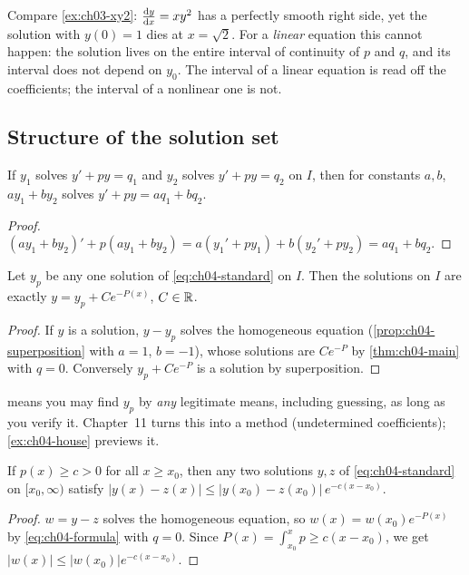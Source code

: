 \begin{remark}\label{rem:ch04-global}
Compare \cref{ex:ch03-xy2}: $\frac{\mathrm{d}y}{\mathrm{d}x} = xy^2$ has a perfectly smooth right
side, yet the solution with $y(0)=1$ dies at $x = \sqrt2$. For a
\emph{linear} equation this cannot happen: the solution lives on the entire
interval of continuity of $p$ and $q$, and its interval does not depend on
$y_0$. The interval of a linear equation is read off the coefficients; the
interval of a nonlinear one is not.
\end{remark}

\subsection{Structure of the solution set}


\begin{proposition}[Superposition]\label{prop:ch04-superposition}
If $y_1$ solves $y' + py = q_1$ and $y_2$ solves $y' + py = q_2$ on $I$, then
for constants $a,b$, $ay_1 + by_2$ solves $y' + py = aq_1 + bq_2$.
\end{proposition}
\begin{proof}
$(ay_1 + by_2)' + p(ay_1 + by_2) = a(y_1' + py_1) + b(y_2' + py_2) = aq_1 + bq_2$.
\end{proof}

\begin{corollary}[General $=$ particular $+$ homogeneous]\label{cor:ch04-structure}
Let $y_p$ be any one solution of \eqref{eq:ch04-standard} on $I$. Then the
solutions on $I$ are exactly $y = y_p + Ce^{-P(x)}$, $C\in\mathbb{R}$.
\end{corollary}
\begin{proof}
If $y$ is a solution, $y - y_p$ solves the homogeneous equation
(\cref{prop:ch04-superposition} with $a = 1$, $b = -1$), whose solutions are
$Ce^{-P}$ by \cref{thm:ch04-main} with $q = 0$. Conversely
$y_p + Ce^{-P}$ is a solution by superposition.
\end{proof}

 means you may find $y_p$ by \emph{any} legitimate
means, including guessing, as long as you verify it. Chapter~11 turns this
into a method (undetermined coefficients); \cref{ex:ch04-house} previews it.

\begin{proposition}\label{prop:ch04-transient}
If $p(x)\ge c>0$ for all $x\ge x_0$, then any two solutions $y, z$ of
\eqref{eq:ch04-standard} on $[x_0,\infty)$ satisfy
$|y(x) - z(x)|\le|y(x_0) - z(x_0)|\,e^{-c(x - x_0)}$.
\end{proposition}
\begin{proof}
$w = y - z$ solves the homogeneous equation, so
$w(x) = w(x_0)e^{-P(x)}$ by \eqref{eq:ch04-formula} with $q = 0$. Since
$P(x) = \int_{x_0}^xp\ge c(x - x_0)$, we get $|w(x)|\le|w(x_0)|e^{-c(x-x_0)}$.
\end{proof}


